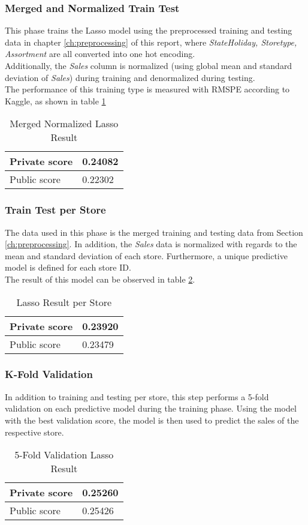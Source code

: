 \subsubsection{Merged and Normalized Train Test}
This phase trains the Lasso model using the preprocessed training and testing data in chapter \ref{ch:preprocessing} of this report, where \textit{StateHoliday, Storetype, Assortment} are all converted into one hot encoding.\\
Additionally, the \textit{Sales} column is normalized (using global mean and standard deviation of \textit{Sales}) during training and denormalized during testing.\\
The performance of this training type is measured with RMSPE according to Kaggle, as shown in table \ref{tab:lasso_merged_norm_result}
\begin{table}[h]
	\centering
	\caption{Merged Normalized Lasso Result}
	\label{tab:lasso_merged_norm_result}
	\begin{tabular}{|m{100pt}|m{50pt}|}
		\hline
		Private score & 0.24082 \\ \hline
		Public score  & 0.22302 \\ \hline
	\end{tabular}
\end{table}

\subsubsection{Train Test per Store}
The data used in this phase is the merged training and testing data from Section \ref{ch:preprocessing}. In addition, the \textit{Sales} data is normalized with regards to the mean and standard deviation of each store. Furthermore, a unique predictive model is defined for each store ID.\\
The result of this model can be observed in table \ref{tab:lasso_result_per_store}.

\begin{table}[h]
	\centering
	\caption{Lasso Result per Store}
	\label{tab:lasso_result_per_store}
	\begin{tabular}{|m{100pt}|m{50pt}|}
		\hline
		Private score & 0.23920 \\ \hline
		Public score  & 0.23479 \\ \hline
	\end{tabular}
\end{table}

\subsubsection{K-Fold Validation}
In addition to training and testing per store, this step performs a 5-fold validation on each predictive model during the training phase. Using the model with the best validation score, the model is then used to predict the sales of the respective store.

\begin{table}[h]
	\centering
	\caption{5-Fold Validation Lasso Result}
	\label{tab:lasso_result_5_fold}
	\begin{tabular}{|m{100pt}|m{50pt}|}
		\hline
		Private score & 0.25260 \\ \hline
		Public score  & 0.25426 \\ \hline
	\end{tabular}
\end{table}
